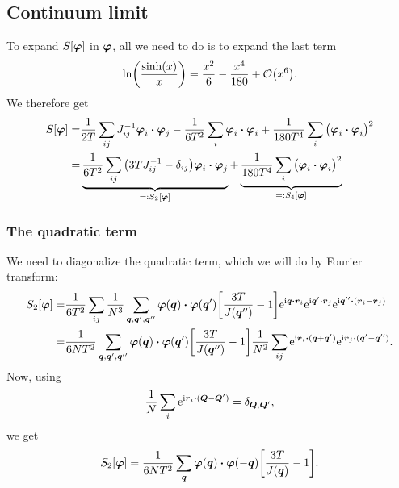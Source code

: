 \documentclass[11pt,letter, swedish, english
]{article}
\begin{document}
\subsection{Continuum limit}
To expand $S[\vb*\varphi]$ in $\vb*\varphi$, all we need to do is to
expand the last term
\begin{equation}
\ln(\frac{\sinh(x)}{x})=\frac{x^2}{6}-\frac{x^4}{180}+\order{x^6}.
\end{equation}
We therefore get
\begin{equation}
\begin{aligned}
S[\vb*\varphi]=&\frac{1}{2T}\sum_{ij}J^{-1}_{ij}\vb*\varphi_i\vdot\vb*\varphi_j
-\frac{1}{6T^2}\sum_i\vb*\varphi_i\vdot\vb*\varphi_i
+\frac{1}{180T^4}\sum_i\big(\vb*\varphi_i\vdot\vb*\varphi_i\big)^2\\
=&\underbrace{\frac{1}{6T^2}\sum_{ij}\qty(3TJ^{-1}_{ij}-\delta_{ij})
\vb*\varphi_i\vdot\vb*\varphi_j}_{=:S_2[\vb*\varphi]}
+\underbrace{\frac{1}{180T^4}\sum_i
\big(\vb*\varphi_i\vdot\vb*\varphi_i\big)^2}_{=:S_4[\vb*\varphi]}
\end{aligned}
\end{equation}

\subsubsection{The quadratic term}
We need to diagonalize the quadratic term, which we will do by Fourier
transform:
\begin{equation}
\begin{aligned}
S_2[\vb*\varphi]=&\frac{1}{6T^2}\sum_{ij}\frac{1}{N^3}
\sum_{\vb*q, \vb*q', \vb*q''}\vb*\varphi(\vb*q)\vdot\vb*\varphi(\vb*q')
\qty[\frac{3T}{J(\vb*q'')}-1]
\ee^{\ii\vb*q\vdot\vb*r_i}\ee^{\ii\vb*q'\vdot\vb*r_j}
\ee^{\ii\vb*q''\vdot(\vb*r_i-\vb*r_j)}\\
=&\frac{1}{6NT^2}\sum_{\vb*q, \vb*q', \vb*q''}
\vb*\varphi(\vb*q)\vdot\vb*\varphi(\vb*q')
\qty[\frac{3T}{J(\vb*q'')}-1]
\frac{1}{N^2}\sum_{ij}\ee^{\ii\vb*r_i\vdot(\vb*q+\vb*q')}
\ee^{\ii\vb*r_j\vdot(\vb*q'-\vb*q'')}.
\end{aligned}
\end{equation}
Now, using 
\begin{equation}
\frac{1}{N}\sum_i\ee^{\ii\vb*r_i\vdot(\vb*Q-\vb*Q')}=\delta_{\vb*Q, \vb*Q'},
\end{equation}
we get
\begin{equation}
S_2[\vb*\varphi]=\frac{1}{6NT^2}\sum_{\vb*q}
\vb*\varphi(\vb*q)\vdot\vb*\varphi(-\vb*q)
\qty[\frac{3T}{J(\vb*q)}-1].
\end{equation}
\end{document}
